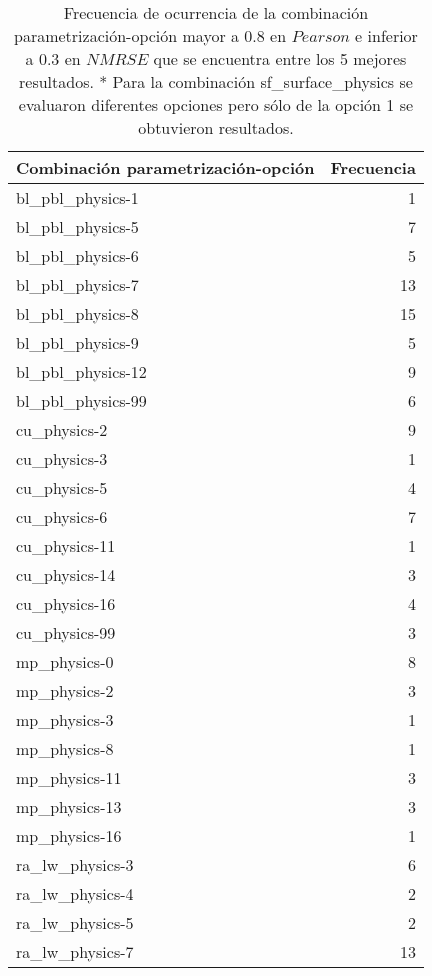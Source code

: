 \begin{itemize}
\begin{table}[H]
\caption{Frecuencia de ocurrencia de la combinación parametrización-opción mayor a 0.8 en $Pearson$ e inferior a 0.3 en $NMRSE$ que se encuentra entre los 5 mejores resultados. * Para la combinación sf\_surface\_physics se evaluaron diferentes opciones pero sólo de la opción 1 se obtuvieron resultados.}
\centering
\label{tabla_mejores_param_opciones}
\begin{tabular}{lr}
\toprule
Combinación parametrización-opción               & Frecuencia       \\
\midrule
bl\_pbl\_physics-1     &      1 \\
bl\_pbl\_physics-5     &      7 \\
bl\_pbl\_physics-6     &      5 \\
bl\_pbl\_physics-7     &     13 \\
bl\_pbl\_physics-8     &     15 \\
bl\_pbl\_physics-9     &      5 \\
bl\_pbl\_physics-12    &      9 \\
bl\_pbl\_physics-99    &      6 \\ \hline
cu\_physics-2         &      9 \\
cu\_physics-3         &      1 \\
cu\_physics-5         &      4 \\
cu\_physics-6         &      7 \\
cu\_physics-11        &      1 \\
cu\_physics-14        &      3 \\
cu\_physics-16        &      4 \\
cu\_physics-99        &      3 \\ \hline
mp\_physics-0         &      8 \\
mp\_physics-2         &      3 \\
mp\_physics-3         &      1 \\
mp\_physics-8         &      1 \\
mp\_physics-11        &      3 \\
mp\_physics-13        &      3 \\
mp\_physics-16        &      1 \\ \hline
ra\_lw\_physics-3      &      6 \\
ra\_lw\_physics-4      &      2 \\
ra\_lw\_physics-5      &      2 \\
ra\_lw\_physics-7      &     13 \\

\end{tabular}
\end{table}
\end{itemize}

